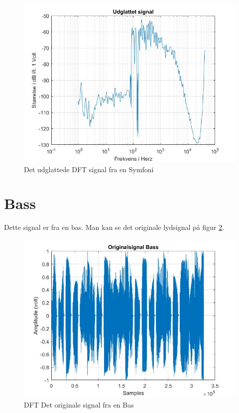 \begin{figure}[H]
	\centering
	\includegraphics[width=120mm]{figures/Symfoni/udglattet.jpg}
	\caption{Det udglattede DFT signal fra en Symfoni}
	\label{fig:Symfoni udglattet}
\end{figure}

\section{Bass}
Dette signal er fra en bas. Man kan se det originale lydsignal på figur \ref{fig:Bas original}.
\begin{figure}[H]
	\centering
	\includegraphics[width=140mm]{figures/Bass/original.jpg}
	\caption{DFT Det originale signal fra en Bas}
	\label{fig:Bas original}
\end{figure}


